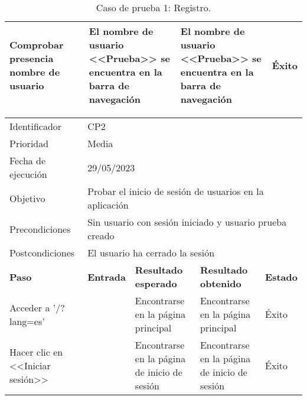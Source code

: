 \begin{table}[H]
\begin{tabular}{p{}p{}p{}p{}p{}}
Comprobar presencia nombre de usuario              &                                                                                                         & El nombre de usuario <<Prueba>> se encuentra en la barra de navegación & El nombre de usuario <<Prueba>> se encuentra en la barra de navegación & Éxito   \\ \hline                        
\end{tabular}
\caption{Caso de prueba 1: Registro.}
\end{table}

\begin{table}[H]
\begin{tabular}{p{}p{}p{}p{}p{}}
\rowcolor{gray!25}
Identificador   & \multicolumn{4}{l}{CP2}                                                    \\
Prioridad   & \multicolumn{4}{l}{Media}                                                    \\
\rowcolor{gray!25}
Fecha de ejecución   & \multicolumn{4}{l}{29/05/2023}                                                    \\
Objetivo        & \multicolumn{4}{l}{Probar el inicio de sesión de usuarios en la aplicación}                                                     \\
\rowcolor{gray!25}
Precondiciones  & \multicolumn{4}{l}{Sin usuario con sesión iniciado y usuario prueba creado}                                                     \\
Postcondiciones & \multicolumn{4}{l}{El usuario ha cerrado la sesión}                                                     \\ \hline
\rowcolor{gray!25}
\textbf{Paso}   & \textbf{Entrada} & \textbf{Resultado esperado} & \textbf{Resultado obtenido} & \textbf{Estado} \\ \hline
Acceder a '/?lang=es'                              &                                                                                                         & Encontrarse en la página principal                                   & Encontrarse en la página principal                                   & Éxito                            \\ \hline
Hacer clic en <<Iniciar sesión>>                       &                                                                                                          & Encontrarse en la página de inicio de sesión                                 & Encontrarse en la página de inicio de sesión                                 & Éxito                            \\ \hline

\end{tabular}
\end{table}
